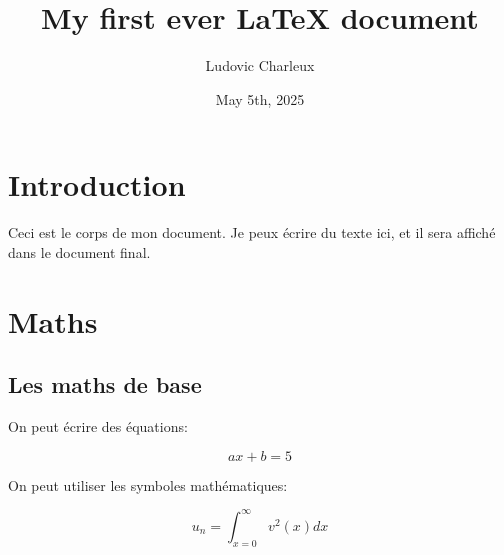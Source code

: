 \documentclass[10pt,a4paper,twoside]{article}
\author{Ludovic Charleux}
\title{My first ever LaTeX document}
\date{May 5th, 2025}
\begin{document}
\maketitle


\section{Introduction}

Ceci est le corps de mon document. 
Je peux écrire du texte ici, et il sera affiché dans le document final.

\section{Maths}

\subsection{Les maths de base}

On peut écrire des équations:

$$
a x + b = 5
$$

On peut utiliser les symboles mathématiques:

\begin{equation}
u_n = \int_{x=0}^\infty v^2(x) dx
\end{equation}
\end{document}
